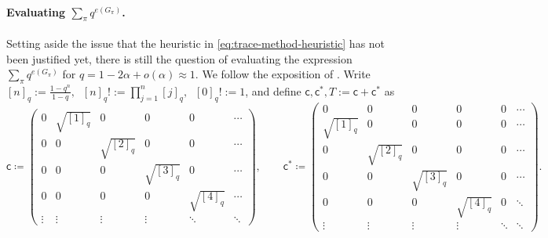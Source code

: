 \documentclass
[11pt,letterpaper]
{article}
\theoremstyle{definition}
\newcommand{\sfc}{\mathsf c}
\newcommand{\1}{\mathbf{1}}
\begin{document}
\paragraph{Evaluating $\sum_\pi q^{e(G_\pi)}$.} Setting aside the issue that the heuristic in \cref{eq:trace-method-heuristic} has not been justified yet, there is still the question of evaluating the expression $\sum_\pi q^{e(G_\pi)}$ for $q = 1 - 2\alpha + o(\alpha)\approx 1$. We follow the exposition of \cite{SYK_Berkooz3}. Write $[n]_q := \frac{1-q^n}{1-q},\;\; [n]_q!:=\prod_{j=1}^n[j]_q,\;\;[0]_q!:=1$, and define $\sfc, \sfc^*, T:= \sfc + \sfc^*$ as
\[
\sfc \coloneqq
\left(
\begin{array}{cccccc}
0 & \sqrt{[1]_q} & 0 & 0 & 0 & \cdots\\
0 & 0 & \sqrt{[2]_q} & 0 & 0 & \cdots\\
0 & 0 & 0 & \sqrt{[3]_q} & 0 & \cdots\\
0 & 0 & 0 & 0 & \sqrt{[4]_q} & \cdots\\
\vdots & \vdots & \vdots & \vdots & \ddots & \ddots
\end{array}
\right),
\qquad
\sfc^* \coloneqq
\left(
\begin{array}{cccccc}
0 & 0 & 0 & 0 & 0 & \cdots\\
\sqrt{[1]_q} & 0 & 0 & 0 & 0 & \cdots\\
0 & \sqrt{[2]_q} & 0 & 0 & 0 & \cdots\\
0 & 0 & \sqrt{[3]_q} & 0 & 0 & \cdots\\
0 & 0 & 0 & \sqrt{[4]_q} & 0 & \ddots\\
\vdots & \vdots & \vdots & \vdots & \ddots & \ddots
\end{array}
\right).
\]
\end{document}
